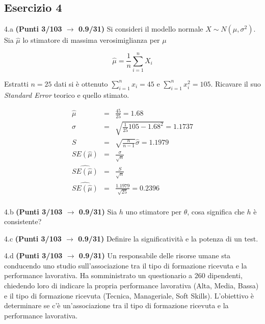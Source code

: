 \documentclass[
  11pt,
]{book}
\theoremstyle{mytheoremstyle}
\theoremstyle{mydefstyle}
\newenvironment{sol}
  {
  \begin{tcolorbox}[enhanced,breakable,arc=0.1mm,boxrule=1pt,colback=white,colframe=iblue,
  title=\bf \fontfamily{lmss}\selectfont \hspace{.5 cm} Soluzione,drop fuzzy shadow]

}{
\end{tcolorbox}
  }
\begin{document}
\subsection{Esercizio 4}\label{esercizio-4-39}

4.a \textbf{(Punti 3/103 \(\rightarrow\) 0.9/31)} Si consideri il modello normale \(X\sim N(\mu,\sigma^2)\). Sia \(\hat\mu\) lo stimatore di massima verosimiglianza per \(\mu\)

\[
  \hat\mu = \frac 1n \sum_{i=1}^n X_i
\]

Estratti \(n=25\) dati si è ottenuto \(\sum_{i=1}^n x_i = 45\) e \(\sum_{i=1}^n x_i^2 = 105\). Ricavare il suo \emph{Standard Error} teorico e quello stimato.

\begin{sol}
\begin{eqnarray*}
  \hat\mu  &=&\frac{45}{25}=1.68\\
  \hat\sigma &=&\sqrt{\frac 1{25}105-1.68^2}=1.1737\\
  S &=&\sqrt{\frac{n}{n-1}}\hat\sigma=1.1979\\
  SE(\hat\mu) &=&  \frac{\sigma}{\sqrt{n}}\\
  \widehat{SE(\hat\mu)} &=& \frac{S}{\sqrt{n}}\\
  \widehat{SE(\hat\mu)} &=& \frac{1.1979}{\sqrt{25}}=0.2396\\
\end{eqnarray*}

\end{sol}

4.b \textbf{(Punti 3/103 \(\rightarrow\) 0.9/31)} Sia \(h\) uno stimatore per \(\theta\), cosa significa che \(h\) è consistente?

4.c \textbf{(Punti 3/103 \(\rightarrow\) 0.9/31)} Definire la significatività e la potenza di un test.

4.d \textbf{(Punti 3/103 \(\rightarrow\) 0.9/31)} Un responsabile delle risorse umane sta conducendo uno studio sull'associazione tra il tipo di formazione ricevuta e la performance lavorativa. Ha somministrato un questionario a 260 dipendenti, chiedendo loro di indicare la propria performance lavorativa (Alta, Media, Bassa) e il tipo di formazione ricevuta (Tecnica, Manageriale, Soft Skills). L'obiettivo è determinare se c'è un'associazione tra il tipo di formazione ricevuta e la performance lavorativa.
\end{document}
